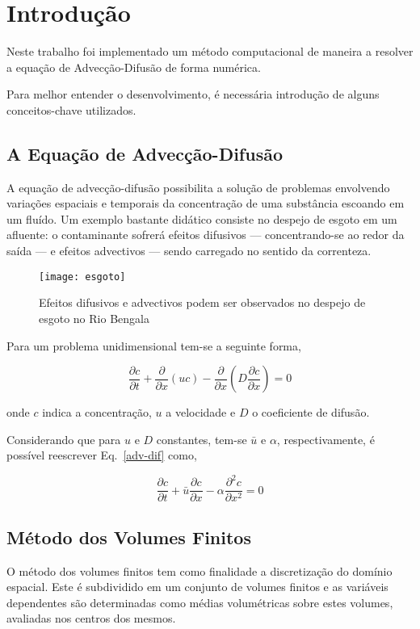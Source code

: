\chapter{Introdução}
Neste trabalho foi implementado um método computacional de maneira a resolver
a equação de Advecção-Difusão de forma numérica.

Para melhor entender o desenvolvimento, é necessária introdução de alguns
conceitos-chave utilizados.

\section{A Equação de Advecção-Difusão}
A equação de advecção-difusão possibilita a solução de problemas envolvendo
variações espaciais e temporais da concentração de uma substância escoando em um
fluído. Um exemplo bastante didático consiste no despejo de esgoto em um
afluente: o contaminante sofrerá efeitos difusivos --- concentrando-se ao redor
da saída --- e efeitos advectivos --- sendo carregado no sentido da correnteza.

\begin{figure}[h]
    \centering
    \captionsetup{justification=centering}
    \texttt{[image: esgoto]}
    \caption{Efeitos difusivos e advectivos podem ser observados no despejo
    de esgoto no Rio Bengala}
\end{figure}


Para um problema unidimensional tem-se a seguinte forma,

\begin{equation}\label{adv-dif}
    \frac{\partial c}{\partial t} + \frac{\partial}{\partial x}(uc)
    - \frac{\partial}{\partial x}\left( D \frac{\partial c}{\partial x} \right)
    = 0
\end{equation}

\noindent onde $c$ indica a concentração, $u$ a velocidade e $D$ o coeficiente
de difusão.

Considerando que para $u$ e $D$ constantes, tem-se $\bar{u}$ e $\alpha$,
respectivamente, é possível reescrever Eq.\ \ref{adv-dif} como,

\begin{equation}
    \frac{\partial c}{\partial t} + \bar{u}\frac{\partial c}{\partial x} -
    \alpha\frac{\partial^2 c}{\partial x^2} = 0
\end{equation}

\section{Método dos Volumes Finitos}
O método dos volumes finitos tem como finalidade a discretização do domínio
espacial. Este é subdividido em um conjunto de volumes finitos e as variáveis
dependentes são determinadas como médias volumétricas sobre estes volumes,
avaliadas nos centros dos mesmos.

